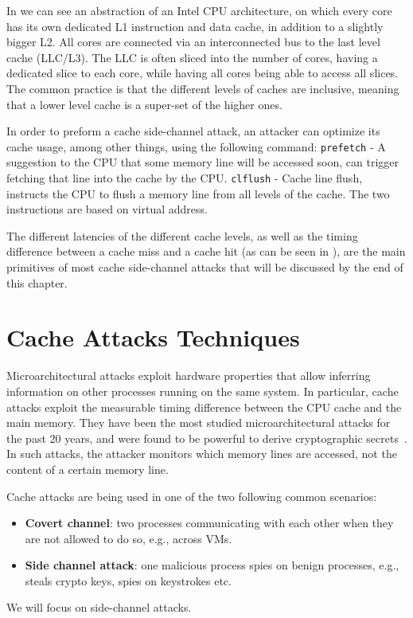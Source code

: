 In  we can see an abstraction of an Intel CPU architecture,
on which every core has its own dedicated L1 instruction and data cache, in
addition to a slightly bigger L2. All cores are connected via an interconnected
bus to the last level cache (LLC/L3). The LLC is often sliced into the number
of cores, having a dedicated slice to each core, while having all cores being
able to access all slices. The common practice is that the different levels of
caches are inclusive, meaning that a lower level cache is a super-set of the
higher ones.  

In order to preform a cache side-channel attack, an attacker can optimize its
cache usage, among other things, using the following command: \texttt{prefetch}
- A suggestion to the CPU that some memory line will be accessed soon, can
trigger fetching that line into the cache by the CPU. \texttt{clflush} - Cache
line flush, instructs the CPU to flush a memory line from all levels of the
cache. The two instructions are based on virtual address.

The different latencies of the different cache levels, as well as the timing
difference between a cache miss and a cache hit (as can be seen in
), are the main primitives of most cache
side-channel attacks that will be discussed by the end of this chapter.  

\section{Cache Attacks Techniques} %
\label{sec:cacheattackstech}

Microarchitectural attacks exploit hardware properties that allow inferring
information on other processes running on the same system. In particular, cache
attacks exploit the measurable timing difference between the CPU cache and the
main memory. They have been the most studied microarchitectural attacks for the
past 20 years, and were found to be powerful to derive cryptographic
secrets~\cite{Percival2009}. In such attacks, the attacker monitors which memory
lines are accessed, not the content of a certain memory line.

\noindent Cache attacks are being used in one of the two following common
scenarios:
\begin{itemize}
\item \textbf{Covert channel}: two processes communicating with each other when
they are not allowed to do so, e.g., across VMs.
\item \textbf{Side channel attack}: one malicious process spies on benign
processes, e.g., steals crypto keys, spies on keystrokes etc. 
\end{itemize}
We will focus on side-channel attacks.

